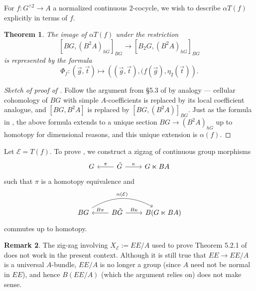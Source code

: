 \documentclass[12 pt]{article}
\newtheorem{theorem}{Theorem}[section]
\theoremstyle{definition}
\newtheorem{remark}[theorem]{Remark}
\newcommand{\calE}{\mathcal{E}}
\begin{document}
For $f:G^{\wedge2}\to A$ a normalized continuous 2-cocycle, we wish to describe $\alpha T(f)$ explicitly in terms of $f$.

\begin{theorem}\label{alpha_2}
The image of $\alpha T(f)$ under the restriction
$$[BG, (B^2A)_{hG}]_{BG}\to[B_2G, (B^2A)_{hG}]_{BG}$$
is represented by the formula
$$\Phi_f:(\vec{g},\vec{t})\mapsto \left((\vec{g},\vec{t}),(f(\vec{g}),\eta_2(\vec{t})\right).$$
\end{theorem}

\begin{proof}[Sketch of proof of ]
Follow the argument from \S5.3 of \cite{Ja} by analogy — cellular cohomology of $BG$ with simple $A$-coefficients is replaced by its local coefficient analogue, and $[BG, B^2A]$ is replaced by $[BG, (B^2A)]_{BG}$. Just as the formula in \cite{Ja}, the above formula extends to a unique section $BG\to (B^2A)_{hG}$ up to homotopy for dimensional reasons, and this unique extension is $\alpha(f)$.
\end{proof}

Let $\calE=T(f)$. To prove , we construct a zigzag of continuous group morphisms
\begin{equation}\label{zigzag}
\begin{tikzcd}
G & \tilde G \arrow[l, "\pi"'] \arrow[r, "\kappa"] & G\ltimes BA
\end{tikzcd}
\end{equation}
such that $\pi$ is a homotopy equivalence and
\begin{equation}\label{Bzigzag}
\begin{tikzcd}
BG \arrow[rr, "\alpha(\calE)", bend left] & B\tilde G \arrow[r,"B\kappa"] \arrow[l,"B\pi"'] & B(G\ltimes BA)
\end{tikzcd}
\end{equation}
commutes up to homotopy.

\begin{remark}
The zig-zag involving $X_\calE:=EE/A$ used to prove Theorem 5.2.1 of \cite{Ja} does not work in the present context. Although it is still true that $EE\to EE/A$ is a universal $A$-bundle, $EE/A$ is no longer a group (since $A$ need not be normal in $EE$), and hence $B(EE/A)$ (which the argument relies on) does not make sense.
\end{remark}
\end{document}
